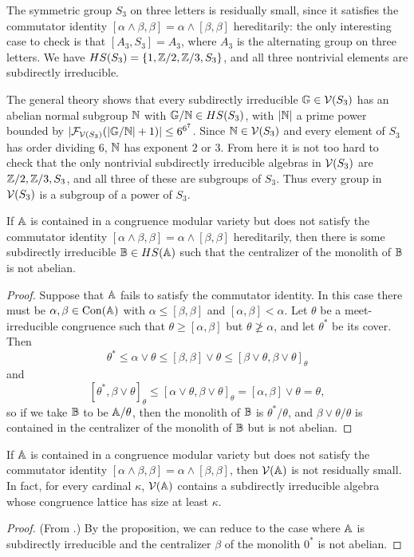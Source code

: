 \begin{appendices}
\begin{ex} The symmetric group $S_3$ on three letters is residually small, since it satisfies the commutator identity $[\alpha \wedge \beta, \beta] = \alpha \wedge [\beta,\beta]$ hereditarily: the only interesting case to check is that $[A_3,S_3] = A_3$, where $A_3$ is the alternating group on three letters. We have $HS(S_3) = \{1, \mathbb{Z}/2, \mathbb{Z}/3, S_3\}$, and all three nontrivial elements are subdirectly irreducible.

The general theory shows that every subdirectly irreducible $\mathbb{G} \in \mathcal{V}(S_3)$ has an abelian normal subgroup $\mathbb{N}$ with $\mathbb{G}/\mathbb{N} \in HS(S_3)$, with $|\mathbb{N}|$ a prime power bounded by $|\mathcal{F}_{\mathcal{V}(S_3)}(|\mathbb{G}/\mathbb{N}|+1)| \le 6^{6^7}$. Since $\mathbb{N} \in \mathcal{V}(S_3)$ and every element of $S_3$ has order dividing $6$, $\mathbb{N}$ has exponent $2$ or $3$. From here it is not too hard to check that the only nontrivial subdirectly irreducible algebras in $\mathcal{V}(S_3)$ are $\mathbb{Z}/2,\mathbb{Z}/3, S_3$, and all three of these are subgroups of $S_3$. Thus every group in $\mathcal{V}(S_3)$ is a subgroup of a power of $S_3$.
\end{ex}

\begin{prop} If $\mathbb{A}$ is contained in a congruence modular variety but does not satisfy the commutator identity $[\alpha \wedge \beta,\beta] = \alpha \wedge [\beta,\beta]$ hereditarily, then there is some subdirectly irreducible $\mathbb{B} \in HS(\mathbb{A})$ such that the centralizer of the monolith of $\mathbb{B}$ is not abelian.
\end{prop}
\begin{proof} Suppose that $\mathbb{A}$ fails to satisfy the commutator identity. In this case there must be $\alpha, \beta \in \operatorname{Con}(\mathbb{A})$ with $\alpha \le [\beta,\beta]$ and $[\alpha,\beta] < \alpha$. Let $\theta$ be a meet-irreducible congruence such that $\theta \ge [\alpha,\beta]$ but $\theta \not\ge \alpha$, and let $\theta^*$ be its cover. Then
\[
\theta^* \le \alpha\vee\theta \le [\beta,\beta]\vee \theta \le [\beta\vee\theta,\beta\vee\theta]_\theta
\]
and
\[
[\theta^*,\beta\vee\theta]_\theta \le [\alpha\vee\theta,\beta\vee\theta]_\theta = [\alpha,\beta]\vee\theta = \theta,
\]
so if we take $\mathbb{B}$ to be $\mathbb{A}/\theta$, then the monolith of $\mathbb{B}$ is $\theta^*/\theta$, and $\beta\vee\theta/\theta$ is contained in the centralizer of the monolith of $\mathbb{B}$ but is not abelian.
\end{proof}

\begin{thm} If $\mathbb{A}$ is contained in a congruence modular variety but does not satisfy the commutator identity $[\alpha \wedge \beta,\beta] = \alpha \wedge [\beta,\beta]$, then $\mathcal{V}(\mathbb{A})$ is not residually small. In fact, for every cardinal $\kappa$, $\mathcal{V}(\mathbb{A})$ contains a subdirectly irreducible algebra whose congruence lattice has size at least $\kappa$.
\end{thm}
\begin{proof} (From \cite{commutator-theory}.) By the proposition, we can reduce to the case where $\mathbb{A}$ is subdirectly irreducible and the centralizer $\beta$ of the monolith $0^*$ is not abelian.


\end{proof}
\end{appendices}
